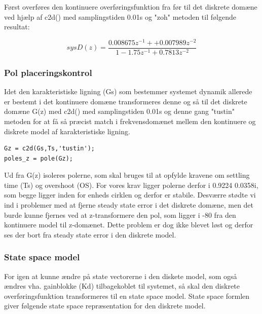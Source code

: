 Først overføres den kontinuere overføringsfunktion fra før til det diskrete domæne ved hjælp af c2d() med samplingstiden 0.01s og "zoh" metoden til følgende resultat:

\begin{equation}
sysD(z) = \frac{0.008675 z^{-1} + + 0.007989 z^{-2}}{1 - 1.75 z^{-1} + 0.7813 z^{-2}}
\end{equation}

\subsubsection{Pol placeringskontrol}
Idet den karakteristiske ligning (Gs) som bestemmer systemet dynamik allerede er bestemt i det kontinuere domæne  transformeres denne og så til det diskrete domæne G(z) med c2d() med samplingstiden 0.01s og denne gang "tustin" metoden for at få så præcist match i frekvensdomænet mellem den kontinuere og diskrete model af karakteristiske ligning. 

\begin{lstlisting}[frame=single]
Gz = c2d(Gs,Ts,'tustin');
poles_z = pole(Gz);
\end{lstlisting}

Ud fra G(z) isoleres polerne, som skal bruges til at opfylde kravene om settling time (Ts) og overshoot (OS). For vores krav ligger polerne  derfor i 0.9224 \textpm0.0358i, som begge ligger inden for enheds cirklen og derfor er stabile.  
Desværre stødte vi ind i problemer med at fjerne steady state error i det diskrete domæne, men det burde kunne fjernes ved at z-transformere den pol, som ligger i -80 fra den kontinuere model til z-domænet. Dette problem er dog ikke blevet løst og derfor ses der bort fra steady state error i den diskrete model.

\subsubsection{State space model}

 For igen at kunne ændre på state vectorerne i den diskete model, som også ændres vha. gainblokke (Kd) tilbagekoblet til systemet, så skal den diskrete overføringsfunktion transformeres til en state space model. State space formlen giver følgende state space repræsentation for den  diskrete model.

